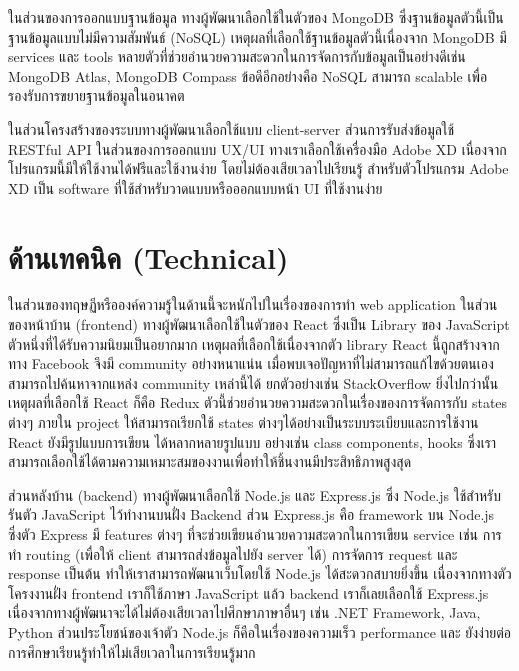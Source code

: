 ในส่วนของการออกแบบฐานข้อมูล ทางผู้พัฒนาเลือกใช้ในตัวของ MongoDB \cite{MongoDB} ซึ่งฐานข้อมูลตัวนี้เป็นฐานข้อมูลแบบไม่มีความสัมพันธ์ (NoSQL) 
เหตุผลที่เลือกใช้ฐานข้อมูลตัวนี้เนื่องจาก MongoDB มี services และ tools หลายตัวที่ช่วยอำนวยความสะดวกในการจัดการกับข้อมูลเป็นอย่างดีเช่น MongoDB Atlas, MongoDB Compass 
ข้อดีอีกอย่างคือ NoSQL สามารถ scalable เพื่อรองรับการขยายฐานข้อมูลในอนาคต 

ในส่วนโครงสร้างของระบบทางผู้พัฒนาเลือกใช้แบบ client-server \cite{Client-Server} ส่วนการรับส่งข้อมูลใช้ RESTful API \cite{RESTFUL}
ในส่วนของการออกแบบ UX/UI ทางเราเลือกใช้เครื่องมือ Adobe XD \cite{AdobeXD} เนื่องจากโปรแกรมนี้มีให้ใช้งานได้ฟรีและใช้งานง่าย โดยไม่ต้องเสียเวลาไปเรียนรู้ สำหรับตัวโปรแกรม Adobe XD เป็น software ที่ใช้สำหรับวาดแบบหรือออกแบบหน้า UI ที่ใช้งานง่าย 

  
  

\section{ด้านเทคนิค (Technical)}
ในส่วนของทฤษฏีหรือองค์ความรู้ในด้านนี้จะหนักไปในเรื่องของการทำ
web application ในส่วนของหน้าบ้าน (frontend) ทางผู้พัฒนาเลือกใช้ในตัวของ
React \cite{React} ซึ่งเป็น Library ของ JavaScript ตัวหนึ่งที่ได้รับความนิยมเป็นอยากมาก เหตุผลที่เลือกใช้เนื่องจากตัว library React นี้ถูกสร้างจากทาง Facebook 
จึงมี community อย่างหนาแน่น  เมื่อพบเจอปัญหาที่ไม่สามารถแก้ไขด้วยตนเอง สามารถไปค้นหาจากแหล่ง community เหล่านี้ได้ ยกตัวอย่างเช่น StackOverflow 
ยิ่งไปกว่านั้นเหตุผลที่เลือกใช้ React ก็คือ Redux \cite{Redux} ตัวนี้ช่วยอำนวยความสะดวกในเรื่องของการจัดการกับ states ต่างๆ  ภายใน project ให้สามารถเรียกใช้ states ต่างๆได้อย่างเป็นระบบระเบียบและการใช้งาน React ยังมีรูปแบบการเขียน
ได้หลากหลายรูปแบบ อย่างเช่น class components, hooks ซึ่งเราสามารถเลือกใช้ได้ตามความเหมาะสมของงานเพื่อทำให้ชิ้นงานมีประสิทธิภาพสูงสุด


ส่วนหลังบ้าน (backend) ทางผู้พัฒนาเลือกใช้ Node.js \cite{NodeJs}
และ Express.js \cite{Express} ซึ่ง Node.js ใช้สำหรับรันตัว JavaScript ไว้ทำงานบนฝั่ง Backend ส่วน Express.js คือ  framework บน Node.js 
ซึ่งตัว Express มี features ต่างๆ  ที่จะช่วยเขียนอำนวยความสะดวกในการเขียน service เช่น การทำ routing (เพื่อให้ client สามารถส่งข้อมูลไปยัง server ได้) การจัดการ request และ response เป็นต้น  ทำให้เราสามารถพัฒนาเว็บโดยใช้ Node.js ได้สะดวกสบายยิ่งขึ้น
เนื่องจากทางตัวโครงงานฝั่ง frontend เราก็ใช้ภาษา JavaScript แล้ว backend เราก็เลยเลือกใช้ Express.js  เนื่องจากทางผู้พัฒนาจะได้ไม่ต้องเสียเวลาไปศึกษาภาษาอื่นๆ เช่น .NET Framework, Java, Python 
ส่วนประโยชน์ของเจ้าตัว Node.js ก็คือในเรื่องของความเร็ว performance และ ยังง่ายต่อการศึกษาเรียนรู้ทำให้ไม่เสียเวลาในการเรียนรู้มาก


